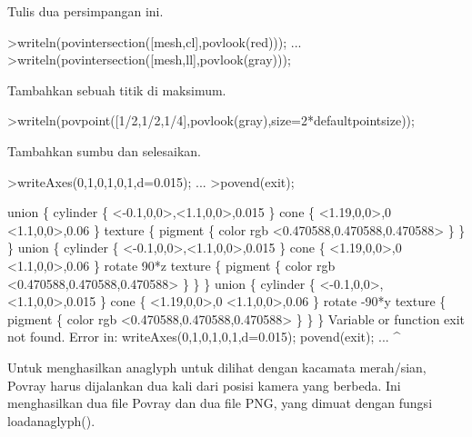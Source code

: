 \documentclass[a4paper,10pt]{article}
\begin{document}
\begin{eulernotebook}
\begin{eulercomment}
\begin{eulercomment}
\begin{eulercomment}
Tulis dua persimpangan ini.
\end{eulercomment}
\begin{eulerprompt}
>writeln(povintersection([mesh,cl],povlook(red))); ...
>writeln(povintersection([mesh,ll],povlook(gray)));
\end{eulerprompt}
\begin{eulercomment}
Tambahkan sebuah titik di maksimum.
\end{eulercomment}
\begin{eulerprompt}
>writeln(povpoint([1/2,1/2,1/4],povlook(gray),size=2*defaultpointsize));
\end{eulerprompt}
\begin{eulercomment}
Tambahkan sumbu dan selesaikan.
\end{eulercomment}
\begin{eulerprompt}
>writeAxes(0,1,0,1,0,1,d=0.015); ...
>povend(exit);
\end{eulerprompt}
\begin{euleroutput}
  union \{
    cylinder \{ <-0.1,0,0>,<1.1,0,0>,0.015 \}
    cone \{ 
      <1.19,0,0>,0
      <1.1,0,0>,0.06
    \}
    texture \{ pigment \{ color rgb <0.470588,0.470588,0.470588> \} \}
  \}
  union \{
    cylinder \{ <-0.1,0,0>,<1.1,0,0>,0.015 \}
    cone \{ 
      <1.19,0,0>,0
      <1.1,0,0>,0.06
    \}
    rotate 90*z
    texture \{ pigment \{ color rgb <0.470588,0.470588,0.470588> \} \}
  \}
  union \{
    cylinder \{ <-0.1,0,0>,<1.1,0,0>,0.015 \}
    cone \{ 
      <1.19,0,0>,0
      <1.1,0,0>,0.06
    \}
    rotate -90*y
    texture \{ pigment \{ color rgb <0.470588,0.470588,0.470588> \} \}
  \}
  Variable or function exit not found.
  Error in:
  writeAxes(0,1,0,1,0,1,d=0.015); povend(exit); ...
                                             ^
\end{euleroutput}
\begin{eulercomment}
Untuk menghasilkan anaglyph untuk dilihat dengan kacamata merah/sian,
Povray harus dijalankan dua kali dari posisi kamera yang berbeda. Ini
menghasilkan dua file Povray dan dua file PNG, yang dimuat dengan
fungsi loadanaglyph().


\end{eulercomment}
\end{eulercomment}
\end{eulercomment}
\end{eulernotebook}
\end{document}
